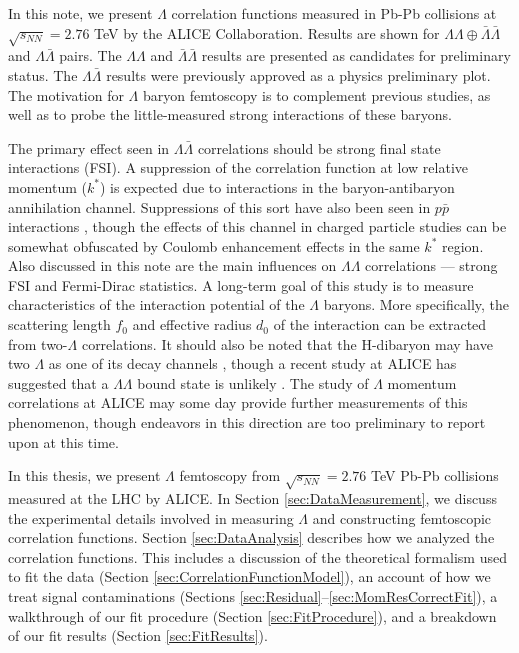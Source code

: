 In this note, we present $\Lambda$ correlation functions measured in Pb-Pb collisions at $\sqrt{s_{NN}}=2.76$ TeV by the ALICE Collaboration.  
Results are shown for $\Lambda\Lambda\oplus\bar{\Lambda}\bar{\Lambda}$ and $\Lambda\bar{\Lambda}$ pairs. 
The $\Lambda\Lambda$ and $\bar{\Lambda}\bar{\Lambda}$ results are presented as candidates for preliminary status. 
The $\Lambda\bar{\Lambda}$ results were previously approved as a physics preliminary plot.  
The motivation for $\Lambda$ baryon femtoscopy is to complement previous studies, as well as to probe the little-measured strong interactions of these baryons.

The primary effect seen in $\Lambda\bar{\Lambda}$ correlations should be strong final state interactions (FSI).  
A suppression of the correlation function at low relative momentum ($k^*$) is expected due to interactions in the baryon-antibaryon annihilation channel.  
Suppressions of this sort have also been seen in $p \bar{p}$ interactions \cite{Gos:2007cj}, though the effects of this channel in charged particle studies can be somewhat obfuscated by Coulomb enhancement effects in the same $k^*$ region.  
Also discussed in this note are the main influences on $\Lambda\Lambda$ correlations --- strong FSI and Fermi-Dirac statistics.  
A long-term goal of this study is to measure characteristics of the interaction potential of the $\Lambda$ baryons.  
More specifically, the scattering length $f_0$ and effective radius $d_0$ of the interaction can be extracted from two-$\Lambda$ correlations. 
It should also be noted that the H-dibaryon may have two $\Lambda$ as one of its decay channels \cite{PhysRevLett.38.195}, though a recent study at ALICE has suggested that a $\Lambda\Lambda$ bound state is unlikely \cite{...}.  
The study of $\Lambda$ momentum correlations at ALICE may some day provide further measurements of this phenomenon, though endeavors in this direction are too preliminary to report upon at this time.








In this thesis, we present $\Lambda$ femtoscopy from $\sqrt{s_{NN}}=2.76$ TeV Pb-Pb collisions measured at the LHC by ALICE.
In Section \ref{sec:DataMeasurement}, we discuss the experimental details involved in measuring $\Lambda$ and constructing femtoscopic correlation functions.
Section \ref{sec:DataAnalysis} describes how we analyzed the correlation functions.
This includes a discussion of the theoretical formalism used to fit the data (Section \ref{sec:CorrelationFunctionModel}), an account of how we treat signal contaminations (Sections \ref{sec:Residual}--\ref{sec:MomResCorrectFit}), a walkthrough of our fit procedure (Section \ref{sec:FitProcedure}), and a breakdown of our fit results (Section \ref{sec:FitResults}).





